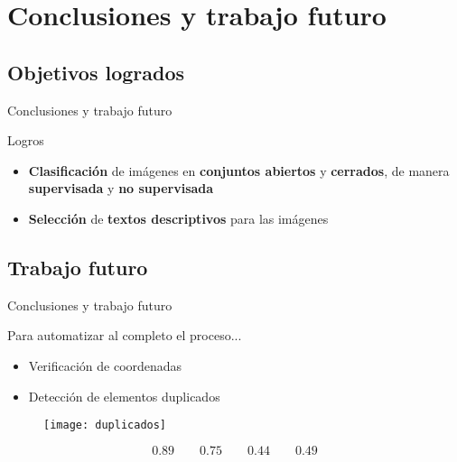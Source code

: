 \documentclass[aspectratio = 169]{beamer}
\begin{document}
	\section{Conclusiones y trabajo futuro}
		
		\subsection{Objetivos logrados}
	
			\begin{frame}{Conclusiones y trabajo futuro}
				\begin{block}{Logros}
					\begin{itemize}
						\item \textbf{Clasificación} de imágenes en \textbf{conjuntos abiertos} y \textbf{cerrados}, de manera \textbf{supervisada} y \textbf{no supervisada}
						\item \textbf{Selección} de \textbf{textos descriptivos} para las imágenes 
					\end{itemize}
				\end{block}
			\end{frame}
			
		\subsection{Trabajo futuro}
		
			\begin{frame}{Conclusiones y trabajo futuro}
				\begin{block}{Para automatizar al completo el proceso...}
					\begin{itemize}
						\item Verificación de coordenadas
						\item Detección de elementos duplicados
					\end{itemize}
				\end{block}
				\begin{figure}
					\centering
					\texttt{[image: duplicados]}
					\label{fig:duplicados}
				\end{figure}
				$$
				0.89 \qquad 0.75 \qquad 0.44 \qquad 0.49
				$$
			\end{frame}
	
	\begin{frame}[plain]
		\maketitle
	\end{frame}
\end{document}
